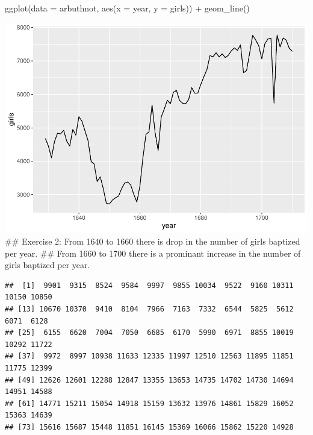 \documentclass[
]{article}
\newenvironment{Shaded}{\begin{snugshade}}{\end{snugshade}}
\newcommand{\AttributeTok}[1]{\textcolor[rgb]{0.77,0.63,0.00}{#1}}
\newcommand{\FunctionTok}[1]{\textcolor[rgb]{0.00,0.00,0.00}{#1}}
\newcommand{\NormalTok}[1]{#1}
\newcommand{\SpecialCharTok}[1]{\textcolor[rgb]{0.00,0.00,0.00}{#1}}
\begin{document}
\begin{Shaded}
\begin{Highlighting}[]
\FunctionTok{ggplot}\NormalTok{(}\AttributeTok{data =}\NormalTok{ arbuthnot, }\FunctionTok{aes}\NormalTok{(}\AttributeTok{x =}\NormalTok{ year, }\AttributeTok{y =}\NormalTok{ girls)) }\SpecialCharTok{+} 
  \FunctionTok{geom\_line}\NormalTok{()}
\end{Highlighting}
\end{Shaded}

\includegraphics{week1_practice_files/figure-latex/unnamed-chunk-10-1.pdf}
\#\# Exercise 2: From 1640 to 1660 there is drop in the number of girls
baptized per year. \#\# From 1660 to 1700 there is a prominant increase
in the number of girls baptized per year.

\begin{Shaded}
\end{Shaded}

\begin{verbatim}
##  [1]  9901  9315  8524  9584  9997  9855 10034  9522  9160 10311 10150 10850
## [13] 10670 10370  9410  8104  7966  7163  7332  6544  5825  5612  6071  6128
## [25]  6155  6620  7004  7050  6685  6170  5990  6971  8855 10019 10292 11722
## [37]  9972  8997 10938 11633 12335 11997 12510 12563 11895 11851 11775 12399
## [49] 12626 12601 12288 12847 13355 13653 14735 14702 14730 14694 14951 14588
## [61] 14771 15211 15054 14918 15159 13632 13976 14861 15829 16052 15363 14639
## [73] 15616 15687 15448 11851 16145 15369 16066 15862 15220 14928
\end{verbatim}
\end{document}
